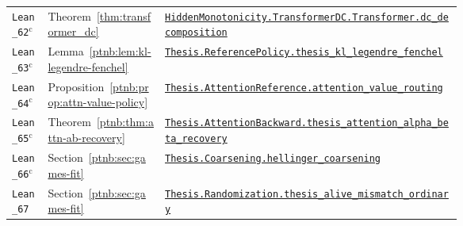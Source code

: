 {\begin{longtable}{@{}l l >{\raggedright\arraybackslash}p{0.66\linewidth}@{}}
\texttt{Lean\_62}$^{\mathrm c}$ & Theorem~\ref{thm:transformer_dc} & \href{https://github.com/JayPiZimmermann/A-Structural-Approach-to-Explainable-Deep-Learning/blob/b1c18a7ed02eadd720b0b693794ba7e7dd2628f6/formalization/HiddenMonotonicity/TransformerCorrectness.lean\#L35}{\texttt{HiddenMonotonicity.\allowbreak TransformerDC.\allowbreak Transformer.\allowbreak dc\_decomposition}} \\
\texttt{Lean\_63}$^{\mathrm c}$ & Lemma~\ref{ptnb:lem:kl-legendre-fenchel} & \href{https://github.com/JayPiZimmermann/A-Structural-Approach-to-Explainable-Deep-Learning/blob/b1c18a7ed02eadd720b0b693794ba7e7dd2628f6/formalization/Thesis/ReferencePolicy.lean\#L120}{\texttt{Thesis.\allowbreak ReferencePolicy.\allowbreak thesis\_kl\_legendre\_fenchel}} \\
\texttt{Lean\_64}$^{\mathrm c}$ & Proposition~\ref{ptnb:prop:attn-value-policy} & \href{https://github.com/JayPiZimmermann/A-Structural-Approach-to-Explainable-Deep-Learning/blob/b1c18a7ed02eadd720b0b693794ba7e7dd2628f6/formalization/Thesis/AttentionReference.lean\#L198}{\texttt{Thesis.\allowbreak AttentionReference.\allowbreak attention\_value\_routing}} \\
\texttt{Lean\_65}$^{\mathrm c}$ & Theorem~\ref{ptnb:thm:attn-ab-recovery} & \href{https://github.com/JayPiZimmermann/A-Structural-Approach-to-Explainable-Deep-Learning/blob/b1c18a7ed02eadd720b0b693794ba7e7dd2628f6/formalization/Thesis/AttentionBackward.lean\#L177}{\texttt{Thesis.\allowbreak AttentionBackward.\allowbreak thesis\_attention\_alpha\_beta\_recovery}} \\
\texttt{Lean\_66}$^{\mathrm c}$ & Section~\ref{ptnb:sec:games-fit} & \href{https://github.com/JayPiZimmermann/A-Structural-Approach-to-Explainable-Deep-Learning/blob/b1c18a7ed02eadd720b0b693794ba7e7dd2628f6/formalization/Thesis/Coarsening.lean\#L74}{\texttt{Thesis.\allowbreak Coarsening.\allowbreak hellinger\_coarsening}} \\
\texttt{Lean\_67} & Section~\ref{ptnb:sec:games-fit} & \href{https://github.com/JayPiZimmermann/A-Structural-Approach-to-Explainable-Deep-Learning/blob/b1c18a7ed02eadd720b0b693794ba7e7dd2628f6/formalization/Thesis/Randomization.lean\#L39}{\texttt{Thesis.\allowbreak Randomization.\allowbreak thesis\_alive\_mismatch\_ordinary}} \\
\end{longtable}
}
